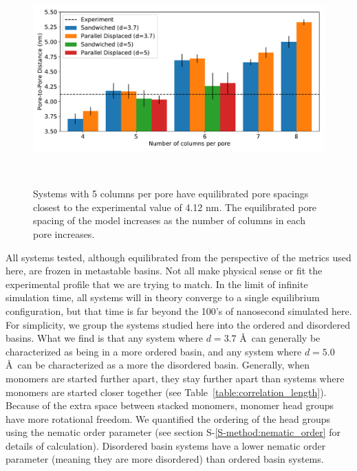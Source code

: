 \documentclass[journal=jpcbfk,manuscript=article]{achemso}
\begin{document}
  \begin{figure}[!htb]
	\centering
	\includegraphics[width=\linewidth]{p2p.pdf}
	\caption{Systems with 5 columns per pore have equilibrated pore spacings closest to
			 the experimental value of 4.12 nm. The equilibrated pore spacing of the model 	
			 increases as the number of columns in each pore increases.}~\label{fig:p2p}
  \end{figure}  
  
  All systems tested, although equilibrated from the perspective of the metrics used here, are
  frozen in metastable basins. Not all make physical sense or fit the experimental profile that 
  we are trying to match. In the limit of infinite simulation time, all systems will in theory 
  converge to a single equilibrium configuration, but that time is far beyond the 100's of 
  nanosecond simulated here. For simplicity, we group the systems studied here into the ordered
  and disordered basins. What we find is that any system where $\mathit{d}=3.7$ \AA~can generally 
  be characterized as being in a more ordered basin, and any system where $\mathit{d}=5.0$ \AA~can
  be characterized as a more the disordered basin. Generally, when monomers are started further 
  apart, they stay further apart than systems where monomers are started closer together 
  (see Table~\ref{table:correlation_length}). Because of the extra space between stacked 
  monomers, monomer head groups have more rotational freedom. We quantified the ordering of
  the head groups using the nematic order parameter (see section S-\ref{S-method:nematic_order}
  for details of calculation). Disordered basin systems have a lower nematic order parameter 
  (meaning they are more disordered) than ordered basin systems.

  
\end{document}
